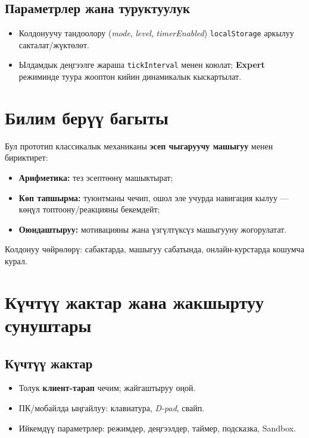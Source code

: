 \documentclass{article}
\begin{document}
\subsection{Параметрлер жана туруктуулук}
\begin{itemize}
  \item Колдонуучу тандоолору (\textit{mode}, \textit{level}, \textit{timerEnabled}) \texttt{localStorage} аркылуу сакталат/жүктөлөт.
  \item Ылдамдык деңгээлге жараша \texttt{tickInterval} менен коюлат; \textbf{Expert} режиминде туура жооптон кийин динамикалык кыскартылат.
\end{itemize}

\section{Билим берүү багыты}
Бул прототип классикалык механиканы \textbf{эсеп чыгаруучу машыгуу} менен бириктирет:
\begin{itemize}
  \item \textbf{Арифметика:} тез эсептөөнү машыктырат;
  \item \textbf{Көп тапшырма:} туюнтманы чечип, ошол эле учурда навигация кылуу — көңүл топтоону/реакцияны бекемдейт;
  \item \textbf{Оюндаштыруу:} мотивацияны жана үзгүлтүксүз машыгууну жогорулатат.
\end{itemize}
Колдонуу чөйрөлөрү: сабактарда, машыгуу сабатында, онлайн-курстарда кошумча курал.

\section{Күчтүү жактар жана жакшыртуу сунуштары}
\subsection*{Күчтүү жактар}
\begin{itemize}
  \item Толук \textbf{клиент-тарап} чечим; жайгаштыруу оңой.
  \item ПК/мобайлда ыңгайлуу: клавиатура, \textit{D-pad}, свайп.
  \item Ийкемдүү параметрлер: режимдер, деңгээлдер, таймер, подсказка, Sandbox.
\end{itemize}
\end{document}
